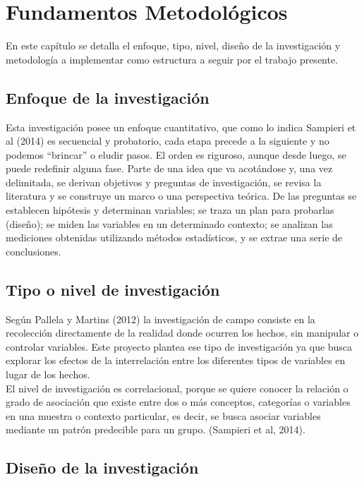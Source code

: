 \chapter{Fundamentos Metodol\'ogicos}
	
	En este capítulo se detalla el enfoque, tipo, nivel, diseño de la investigación y metodología a implementar como estructura a seguir por el trabajo presente. 
	
\section{Enfoque de la investigaci\'on}

	Esta investigación posee un enfoque cuantitativo, que como lo indica Sampieri et al (2014) es  secuencial y probatorio, cada etapa precede a la siguiente y no podemos “brincar” o eludir pasos. El orden es riguroso, aunque desde luego, se puede redefinir alguna fase. Parte de una idea que va acotándose y, una vez delimitada, se derivan objetivos y preguntas de investigación, se revisa la literatura y se construye un marco o una perspectiva teórica. De las preguntas se establecen hipótesis y determinan variables; se traza un plan para probarlas (diseño); se miden las variables en un determinado contexto; se analizan las mediciones obtenidas utilizando métodos estadísticos, y se extrae una serie de conclusiones.\\
	
	
\section{Tipo o nivel de investigaci\'on}

Según Pallela y Martins (2012) la investigación de campo consiste en la recolección directamente de la realidad donde ocurren los hechos, sin manipular o controlar variables. Este proyecto plantea ese tipo de investigación ya que busca explorar los efectos de la interrelación entre los diferentes tipos de variables en lugar de los hechos.\\

El nivel de investigación es correlacional, porque se quiere conocer la relación o grado de asociación que existe entre dos o más conceptos, categorías o variables en una muestra o contexto particular, es decir, se busca asociar variables mediante un patrón predecible para un grupo. (Sampieri et al, 2014).

	
\section{Dise\~no de la investigaci\'on}


